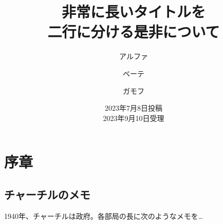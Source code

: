 \documentclass{jlreq}
\begin{document}
\title{非常に長いタイトルを \\ 二行に分ける是非について}
\author{アルファ \and ベーテ \and ガモフ}
\date{2023年7月8日投稿 \\ 2023年9月10日受理}
\maketitle

\section{序章}
\subsection{チャーチルのメモ}
 1940年、チャーチルは政府。各部局の長に次のようなメモを…
\end{document}
